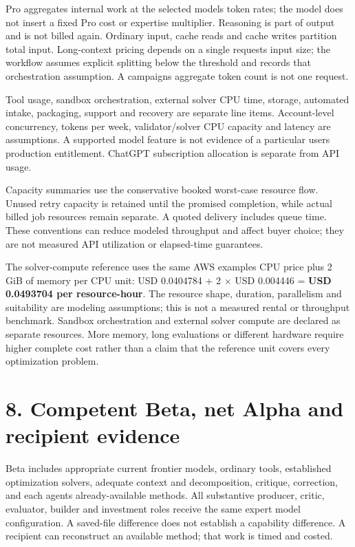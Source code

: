 \documentclass[
  10pt,
]{article}
\let\studysection\section
\renewcommand{\section}{\Needspace{7\baselineskip}\studysection}
\begin{document}
Pro aggregates internal work at the selected model\textquotesingle s
token rates; the model does not insert a fixed Pro cost or expertise
multiplier. Reasoning is part of output and is not billed again.
Ordinary input, cache reads and cache writes partition total input.
Long-context pricing depends on a single request\textquotesingle s input
size; the workflow assumes explicit splitting below the threshold and
records that orchestration assumption. A campaign\textquotesingle s
aggregate token count is not one request.

Tool usage, sandbox orchestration, external solver CPU time, storage,
automated intake, packaging, support and recovery are separate line
items. Account-level concurrency, tokens per week, validator/solver CPU
capacity and latency are assumptions. A supported model feature is not
evidence of a particular user\textquotesingle s production entitlement.
ChatGPT subscription allocation is separate from API usage.

Capacity summaries use the conservative booked worst-case resource flow.
Unused retry capacity is retained until the promised completion, while
actual billed job resources remain separate. A quoted delivery includes
queue time. These conventions can reduce modeled throughput and affect
buyer choice; they are not measured API utilization or elapsed-time
guarantees.

The solver-compute reference uses the same AWS example\textquotesingle s
CPU price plus 2 GiB of memory per CPU unit: USD 0.0404784 + 2 × USD
0.004446 = \textbf{USD 0.0493704 per resource-hour}. The resource shape,
duration, parallelism and suitability are modeling assumptions; this is
not a measured rental or throughput benchmark. Sandbox orchestration and
external solver compute are declared as separate resources. More memory,
long evaluations or different hardware require higher complete cost
rather than a claim that the reference unit covers every optimization
problem.

\hypertarget{8-competent-beta-net-alpha-and-recipient-evidence}{%
\section{8. Competent Beta, net Alpha and recipient
evidence}\label{8-competent-beta-net-alpha-and-recipient-evidence}}

Beta includes appropriate current frontier models, ordinary tools,
established optimization solvers, adequate context and decomposition,
critique, correction, and each agent\textquotesingle s already-available
methods. All substantive producer, critic, evaluator, builder and
investment roles receive the same expert model configuration. A
saved-file difference does not establish a capability difference. A
recipient can reconstruct an available method; that work is timed and
costed.
\end{document}
